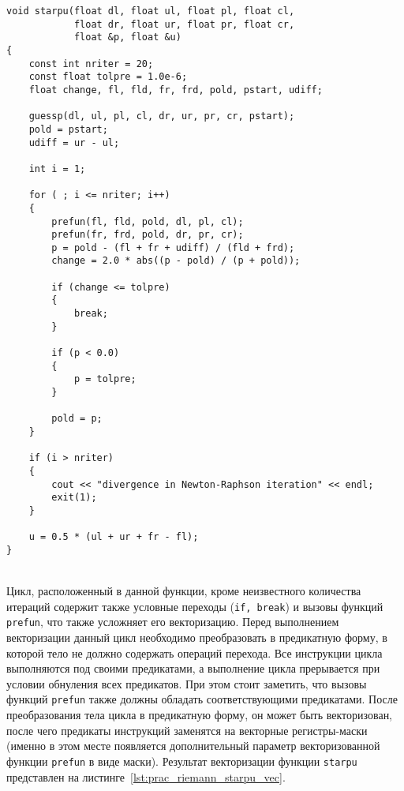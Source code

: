 \documentclass[
11pt,%
tightenlines,%
twoside,%
onecolumn,%
nofloats,%
nobibnotes,%
nofootinbib,%
superscriptaddress,%
noshowpacs,%
centertags]%
{revtex4}
\begin{document}
\begin{lstlisting}[caption={Оригинальная версия функции \texttt{starpu}.},label={lst:prac_riemann_starpu_orig}]
void starpu(float dl, float ul, float pl, float cl,
            float dr, float ur, float pr, float cr,
            float &p, float &u)
{
    const int nriter = 20;
    const float tolpre = 1.0e-6;
    float change, fl, fld, fr, frd, pold, pstart, udiff;

    guessp(dl, ul, pl, cl, dr, ur, pr, cr, pstart);
    pold = pstart;
    udiff = ur - ul;

    int i = 1;

    for ( ; i <= nriter; i++)
    {
        prefun(fl, fld, pold, dl, pl, cl);
        prefun(fr, frd, pold, dr, pr, cr);
        p = pold - (fl + fr + udiff) / (fld + frd);
        change = 2.0 * abs((p - pold) / (p + pold));

        if (change <= tolpre)
        {
            break;
        }

        if (p < 0.0)
        {
            p = tolpre;
        }

        pold = p;
    }

    if (i > nriter)
    {
        cout << "divergence in Newton-Raphson iteration" << endl;
        exit(1);
    }

    u = 0.5 * (ul + ur + fr - fl);
}
\end{lstlisting}

\ \\

Цикл, расположенный в данной функции, кроме неизвестного количества итераций содержит также условные переходы (\texttt{if, break}) и вызовы функций \texttt{prefun}, что также усложняет его векторизацию.
Перед выполнением векторизации данный цикл необходимо преобразовать в предикатную форму, в которой тело не должно содержать операций перехода.
Все инструкции цикла выполняются под своими предикатами, а выполнение цикла прерывается при условии обнуления всех предикатов.
При этом стоит заметить, что вызовы функций \texttt{prefun} также должны обладать соответствующими предикатами.
После преобразования тела цикла в предикатную форму, он может быть векторизован, после чего предикаты инструкций заменятся на векторные регистры-маски (именно в этом месте появляется дополнительный параметр векторизованной функции \texttt{prefun} в виде маски).
Результат векторизации функции \texttt{starpu} представлен на листинге~\ref{lst:prac_riemann_starpu_vec}.
\end{document}
